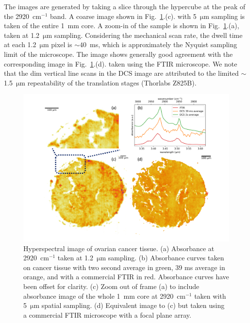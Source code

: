 \documentclass[aip,reprint]{revtex4-1}
\begin{document}
The images are generated by taking a slice through the hypercube at the peak of the \mbox{2920 $\mathrm{cm^{-1}}$} band. A coarse image shown in \mbox{Fig. \ref{fig:bio}.(c).} with \mbox{5 $\mathrm{\mu m}$} sampling is taken of the entire \mbox{1 mm} core. A zoom-in of the sample is shown in \mbox{Fig. \ref{fig:bio}.(a)}, taken at \mbox{1.2 $\mathrm{\mu m}$} sampling. Considering the mechanical scan rate, the dwell time at each \mbox{1.2 $\mathrm{\mu m}$} pixel is \mbox{$\sim 40$ ms}, which is approximately the Nyquist sampling limit of the microscope. The image shows generally good agreement with the corresponding image in \mbox{Fig. \ref{fig:bio}.(d).} taken using the FTIR microscope. We note that the dim vertical line scans in the DCS image are attributed to the limited \mbox{$\sim$1.5 $\mathrm{\mu m}$} repeatability of the translation stages (Thorlabs Z825B).


\begin{figure}[!h]
    \centering
    \includegraphics[width=\linewidth]{bio_image_w_FTIR_comparison.png}
    \caption{Hyperspectral image of ovarian cancer tissue. (a) Absorbance at \mbox{2920 $\mathrm{cm^{-1}}$} taken at \mbox{1.2 $\mathrm{\mu m}$} sampling. (b) Absorbance curves taken on cancer tissue with two second average in green, 39 ms average in orange, and with a commercial FTIR in red. Absorbance curves have been offset for clarity. (c) Zoom out of frame (a) to include absorbance image of the whole \mbox{1 mm} core at \mbox{2920 $\mathrm{cm^{-1}}$} taken with \mbox{5 $\mathrm{\mu m}$} spatial sampling. (d) Equivalent image to (c) but taken using a commercial FTIR microscope with a focal plane array.}
    \label{fig:bio}
\end{figure}
\end{document}
